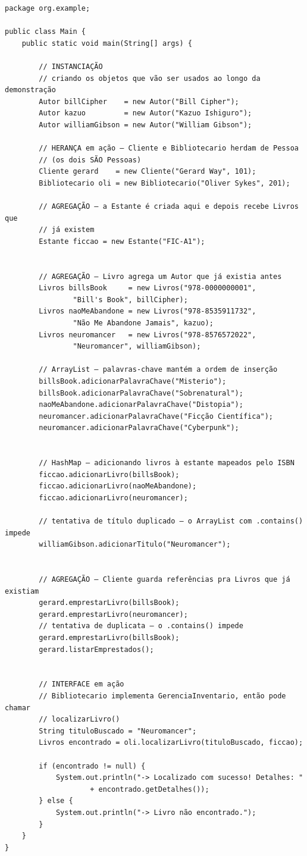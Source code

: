 \begin{lstlisting}[style=java, caption={Exemplo de Aplicação de POO em Java: \texttt{Main.java}}]
package org.example;

public class Main {
    public static void main(String[] args) {

        // INSTANCIAÇÃO
        // criando os objetos que vão ser usados ao longo da demonstração
        Autor billCipher    = new Autor("Bill Cipher");
        Autor kazuo         = new Autor("Kazuo Ishiguro");
        Autor williamGibson = new Autor("William Gibson");

        // HERANÇA em ação — Cliente e Bibliotecario herdam de Pessoa
        // (os dois SÃO Pessoas)
        Cliente gerard    = new Cliente("Gerard Way", 101);
        Bibliotecario oli = new Bibliotecario("Oliver Sykes", 201);

        // AGREGAÇÃO — a Estante é criada aqui e depois recebe Livros que
        // já existem
        Estante ficcao = new Estante("FIC-A1");


        // AGREGAÇÃO — Livro agrega um Autor que já existia antes
        Livros billsBook     = new Livros("978-0000000001",
                "Bill's Book", billCipher);
        Livros naoMeAbandone = new Livros("978-8535911732",
                "Não Me Abandone Jamais", kazuo);
        Livros neuromancer   = new Livros("978-8576572022",
                "Neuromancer", williamGibson);

        // ArrayList — palavras-chave mantém a ordem de inserção
        billsBook.adicionarPalavraChave("Misterio");
        billsBook.adicionarPalavraChave("Sobrenatural");
        naoMeAbandone.adicionarPalavraChave("Distopia");
        neuromancer.adicionarPalavraChave("Ficção Científica");
        neuromancer.adicionarPalavraChave("Cyberpunk");


        // HashMap — adicionando livros à estante mapeados pelo ISBN
        ficcao.adicionarLivro(billsBook);
        ficcao.adicionarLivro(naoMeAbandone);
        ficcao.adicionarLivro(neuromancer);

        // tentativa de título duplicado — o ArrayList com .contains() impede
        williamGibson.adicionarTitulo("Neuromancer");


        // AGREGAÇÃO — Cliente guarda referências pra Livros que já existiam
        gerard.emprestarLivro(billsBook);
        gerard.emprestarLivro(neuromancer);
        // tentativa de duplicata — o .contains() impede
        gerard.emprestarLivro(billsBook);
        gerard.listarEmprestados();


        // INTERFACE em ação
        // Bibliotecario implementa GerenciaInventario, então pode chamar
        // localizarLivro()
        String tituloBuscado = "Neuromancer";
        Livros encontrado = oli.localizarLivro(tituloBuscado, ficcao);

        if (encontrado != null) {
            System.out.println("-> Localizado com sucesso! Detalhes: "
                    + encontrado.getDetalhes());
        } else {
            System.out.println("-> Livro não encontrado.");
        }
    }
}
\end{lstlisting}

